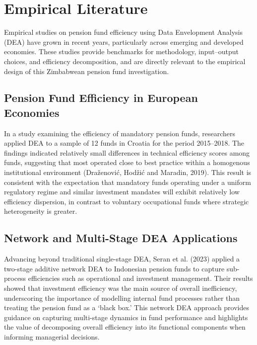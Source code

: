 \documentclass[12pt,a4paper]{article}
\begin{document}
\section{Empirical Literature}

Empirical studies on pension fund efficiency using Data Envelopment Analysis (DEA) have grown in recent years, particularly across emerging and developed economies. These studies provide benchmarks for methodology, input--output choices, and efficiency decomposition, and are directly relevant to the empirical design of this Zimbabwean pension fund investigation.

\subsection{Pension Fund Efficiency in European Economies}

In a study examining the efficiency of mandatory pension funds, researchers applied DEA to a sample of 12 funds in Croatia for the period 2015--2018. The findings indicated relatively small differences in technical efficiency scores among funds, suggesting that most operated close to best practice within a homogenous institutional environment (Dra\v{z}enovi\'{c}, Hod\v{z}i\'{c} and Maradin, 2019). This result is consistent with the expectation that mandatory funds operating under a uniform regulatory regime and similar investment mandates will exhibit relatively low efficiency dispersion, in contrast to voluntary occupational funds where strategic heterogeneity is greater.

\subsection{Network and Multi-Stage DEA Applications}

Advancing beyond traditional single-stage DEA, Seran et al. (2023) applied a two-stage additive network DEA to Indonesian pension funds to capture sub-process efficiencies such as operational and investment management. Their results showed that investment efficiency was the main source of overall inefficiency, underscoring the importance of modelling internal fund processes rather than treating the pension fund as a `black box.' This network DEA approach provides guidance on capturing multi-stage dynamics in fund performance and highlights the value of decomposing overall efficiency into its functional components when informing managerial decisions.
\end{document}
